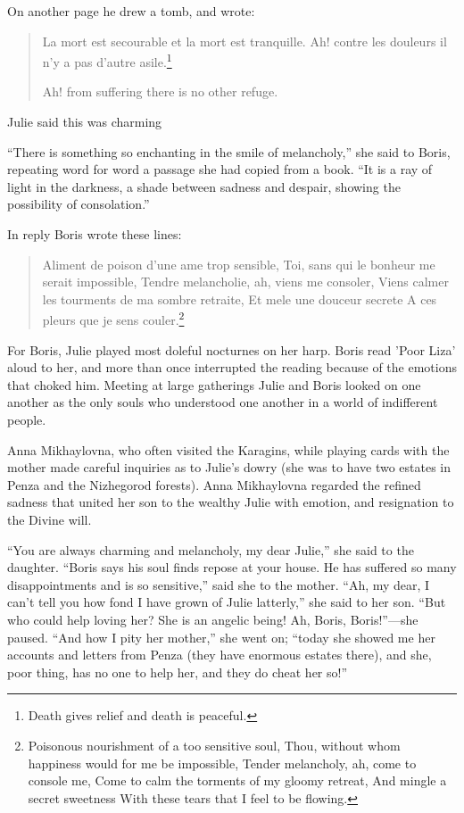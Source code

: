 On another page he drew a tomb, and wrote:

\begin{quote} \calli
La mort est secourable et la mort est
tranquille. Ah! contre les douleurs il n'y a pas d'autre
asile.\footnote{Death gives relief and death is peaceful.}

  Ah! from suffering there is no other refuge.
\end{quote}

Julie said this was charming

``There is something so enchanting in the smile of melancholy,''
she said to Boris, repeating word for word a passage she had
copied from a book.  ``It is a ray of light in the darkness, a
shade between sadness and despair, showing the possibility of
consolation.''

In reply Boris wrote these lines: 

\begin{quote} \calli
Aliment de poison d'une ame trop sensible, Toi,
sans qui le bonheur me serait impossible, Tendre melancholie, ah,
viens me consoler, Viens calmer les tourments de ma sombre
retraite, Et mele une douceur secrete A ces pleurs que je sens
couler.\footnote{Poisonous nourishment of a too sensitive soul,
Thou, without whom happiness would for me be impossible, Tender
melancholy, ah, come to console me, Come to calm the torments of
my gloomy retreat, And mingle a secret sweetness With these tears
that I feel to be flowing.}
\end{quote}

For Boris, Julie played most doleful nocturnes on her harp. Boris
read 'Poor Liza' aloud to her, and more than once interrupted the
reading because of the emotions that choked him. Meeting at large
gatherings Julie and Boris looked on one another as the only
souls who understood one another in a world of indifferent
people.

Anna Mikhaylovna, who often visited the Karagins, while playing
cards with the mother made careful inquiries as to Julie's dowry
(she was to have two estates in Penza and the Nizhegorod
forests). Anna Mikhaylovna regarded the refined sadness that
united her son to the wealthy Julie with emotion, and resignation
to the Divine will.

``You are always charming and melancholy, my dear Julie,'' she
said to the daughter. ``Boris says his soul finds repose at your
house. He has suffered so many disappointments and is so
sensitive,'' said she to the mother. ``Ah, my dear, I can't tell
you how fond I have grown of Julie latterly,'' she said to her
son. ``But who could help loving her? She is an angelic being!
Ah, Boris, Boris!''---she paused. ``And how I pity her mother,''
she went on; ``today she showed me her accounts and letters from
Penza (they have enormous estates there), and she, poor thing,
has no one to help her, and they do cheat her so!''

